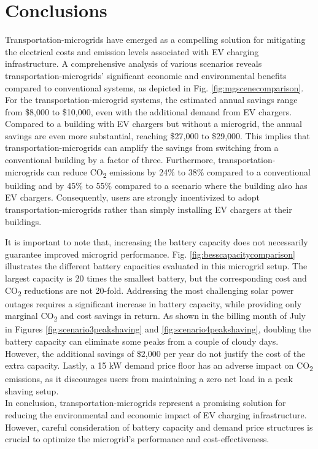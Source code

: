 \documentclass[conference]{IEEEtran}
\begin{document}
	\section{Conclusions}
		Transportation-microgrids have emerged as a compelling solution for mitigating the electrical costs and emission levels associated with EV charging infrastructure. A comprehensive analysis of various scenarios reveals transportation-microgrids' significant economic and environmental benefits compared to conventional systems, as depicted in Fig. \ref{fig:mgscenecomparison}. For the transportation-microgrid systems, the estimated annual savings range from \$8,000 to \$10,000, even with the additional demand from EV chargers. Compared to a building with EV chargers but without a microgrid, the annual savings are even more substantial, reaching \$27,000 to \$29,000. This implies that transportation-microgrids can amplify the savings from switching from a conventional building by a factor of three. Furthermore, transportation-microgrids can reduce CO\textsubscript{2} emissions by 24\% to 38\% compared to a conventional building and by 45\% to 55\% compared to a scenario where the building also has EV chargers. Consequently, users are strongly incentivized to adopt transportation-microgrids rather than simply installing EV chargers at their buildings. 
		
		It is important to note that, increasing the battery capacity does not necessarily guarantee improved microgrid performance. Fig. \ref{fig:besscapacitycomparison} illustrates the different battery capacities evaluated in this microgrid setup. The largest capacity is 20 times the smallest battery, but the corresponding cost and CO\textsubscript{2} reductions are not 20-fold. Addressing the most challenging solar power outages requires a significant increase in battery capacity, while providing only marginal CO\textsubscript{2} and cost savings in return. As shown in the billing month of July in Figures \ref{fig:scenario3peakshaving} and \ref{fig:scenario4peakshaving}, doubling the battery capacity can eliminate some peaks from a couple of cloudy days. However, the additional savings of \$2,000 per year do not justify the cost of the extra capacity. Lastly, a 15 kW demand price floor has an adverse impact on CO\textsubscript{2} emissions, as it discourages users from maintaining a zero net load in a peak shaving setup. \\
		
		In conclusion, transportation-microgrids represent a promising solution for reducing the environmental and economic impact of EV charging infrastructure. However, careful consideration of battery capacity and demand price structures is crucial to optimize the microgrid's performance and cost-effectiveness.
\end{document}
